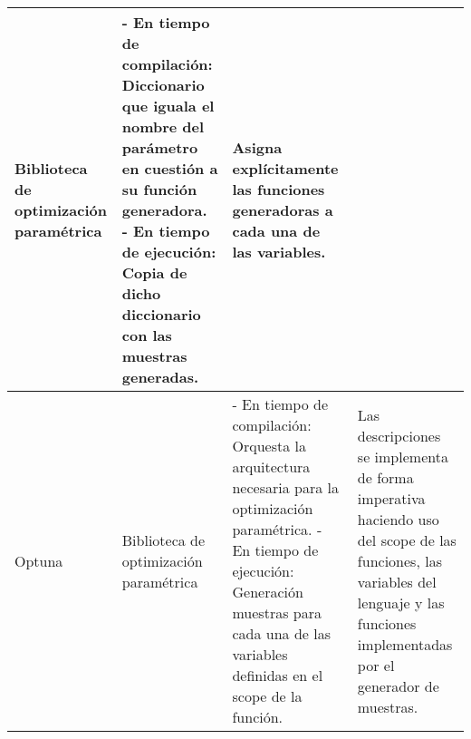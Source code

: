 \begin{longtable}{  p{2.5cm}  p{4cm}  p{6.8cm}  p{6.5cm} }
    Biblioteca de optimización paramétrica                                                                                                                                                                                                                                                                                                                        &
    - En tiempo de compilación: Diccionario que iguala el nombre del parámetro en cuestión a su función generadora. \newline- En tiempo de ejecución: Copia de dicho diccionario con las muestras generadas.                                                                                                                                                        &
    Asigna explícitamente las funciones generadoras a cada una de las variables.                                                                                                                                                                                                                                                                                     \\
    \hline
    \rowcolor{lavender}
    Optuna                                                                                                                                                                                                                                                                                                                                                        &
    Biblioteca de optimización paramétrica                                                                                                                                                                                                                                                                                                                        &
    - En tiempo de compilación: Orquesta la arquitectura necesaria para la optimización paramétrica. \newline- En tiempo de ejecución: Generación muestras para cada una de las variables definidas en el scope de la función.                                                                                                                                    &
    Las descripciones se implementa de forma imperativa haciendo uso del scope de las funciones, las variables del lenguaje y las funciones implementadas por el generador de muestras.                                                                                                                                                                              \\

\end{longtable}
